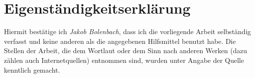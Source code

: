 \section{Eigenständigkeitserklärung}
Hiermit bestätige ich \textit{Jakob Bolenbach}, dass ich die vorliegende Arbeit selbständig verfasst und keine
anderen als die angegebenen Hilfsmittel benutzt habe. Die Stellen der Arbeit, die dem
Wortlaut oder dem Sinn nach anderen Werken (dazu zählen auch Internetquellen)
entnommen sind, wurden unter Angabe der Quelle kenntlich gemacht. 

